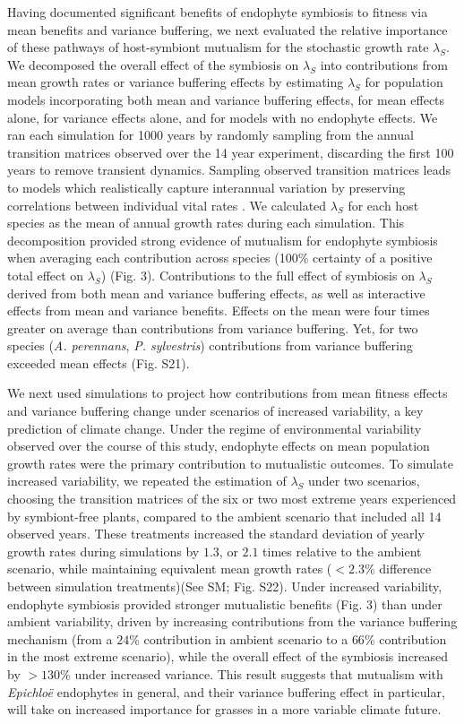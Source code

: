 \documentclass[12pt]{article}
\begin{document}
Having documented significant benefits of endophyte symbiosis to fitness via mean benefits and variance buffering, we next evaluated the relative importance of these pathways of host-symbiont mutualism for the stochastic growth rate $\lambda_{S}$.
We decomposed the overall effect of the symbiosis on $\lambda_{S}$ into contributions from mean growth rates or variance buffering effects by estimating $\lambda_{S}$ for population models incorporating both mean and variance buffering effects, for mean effects alone, for variance effects alone, and for models with no endophyte effects. 
We ran each simulation for 1000 years by randomly sampling from the annual transition matrices observed over the 14 year experiment, discarding the first 100 years to remove transient dynamics. 
Sampling observed transition matrices leads to models which realistically capture interannual variation by preserving correlations between individual vital rates \cite{metcalf2015statistical}.
We calculated $\lambda_{S}$ for each host species as the mean of annual growth rates during each simulation.  
This decomposition provided strong evidence of mutualism for endophyte symbiosis when averaging each contribution across species (100\% certainty of a positive total effect on $\lambda_{S}$) (Fig. 3).
Contributions to the full effect of symbiosis on $\lambda_{S}$ derived from both mean and variance buffering effects, as well as interactive effects from mean and variance benefits. 
Effects on the mean were four times greater on average than contributions from variance buffering. 
Yet, for two species (\emph{A. perennans}, \emph{P. sylvestris}) contributions from variance buffering exceeded mean effects (Fig. S21). 

We next used simulations to project how contributions from mean fitness effects and variance buffering change under scenarios of increased variability, a key prediction of climate change.
Under the regime of environmental variability observed over the course of this study, endophyte effects on mean population growth rates were the primary contribution to mutualistic outcomes.
To simulate increased variability, we repeated the estimation of $\lambda_{S}$ under two scenarios, choosing the transition matrices of the six or two most extreme years experienced by symbiont-free plants, compared to the ambient scenario that included all 14 observed years. 
These treatments increased the standard deviation of yearly growth rates during simulations by $1.3$, or $2.1$ times relative to the ambient scenario, while maintaining equivalent mean growth rates ($<2.3$\% difference between simulation treatments)(See SM; Fig. S22).
Under increased variability, endophyte symbiosis provided stronger mutualistic benefits (Fig. 3) than under ambient variability, driven by increasing contributions from the variance buffering mechanism (from a $24$\% contribution in ambient scenario to a $66$\% contribution in the most extreme scenario), while the overall effect of the symbiosis increased by $>130 $\% under increased variance.
This result suggests that mutualism with \emph{Epichlo\"{e}} endophytes in general, and their variance buffering effect in particular, will take on increased importance for grasses in a more variable climate future.
\end{document}
